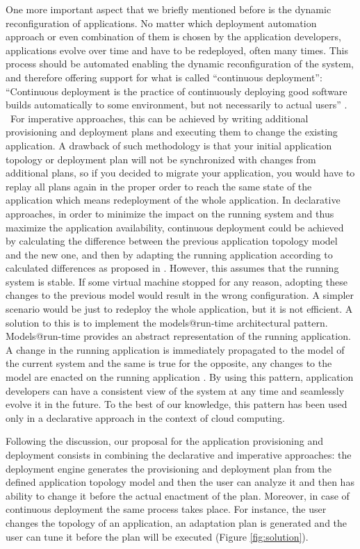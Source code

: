 \noindent One more important aspect that we briefly mentioned before is the dynamic reconfiguration of applications. No matter which deployment automation approach or even combination of them is chosen by the application developers, applications evolve over time and have to be redeployed, often many times. This process should be automated enabling the dynamic reconfiguration of the system, and therefore offering support for what is called ``continuous deployment'': ``Continuous deployment is the practice of continuously deploying good software builds automatically to some environment, but not necessarily to actual users'' \cite{fitzgerald2014continuous}. ~For imperative approaches, this can be achieved by writing additional provisioning and deployment plans and executing them to change the existing application. A drawback of such methodology is that your initial application topology or deployment plan will not be synchronized with changes from additional plans, so if you decided to migrate your application, you would have to replay all plans again in the proper order to reach the same state of the application which means redeployment of the whole application. In declarative approaches, in order to minimize the impact on the running system and thus maximize the application availability, continuous deployment could be achieved by calculating the difference between the previous application topology model and the new one, and then by adapting the running application according to calculated differences as proposed in \cite{FerrySongRCS14}. However, this assumes that the running system is stable. If some virtual machine stopped for any reason, adopting these changes to the previous model would result in the wrong configuration. A simpler scenario would be just to redeploy the whole application, but it is not efficient. A solution to this is to implement the models@run-time architectural pattern. Models@run-time provides an abstract representation of the running application. A change in the running application is immediately propagated to the model of the current system and the same is true for the opposite, any changes to the model are enacted on the running application \cite{FerrySongRCS14}. By using this pattern, application developers can have a consistent view of the system at any time and seamlessly evolve it in the future. To the best of our knowledge, this pattern has been used only in a declarative approach in the context of cloud computing.

\noindent 

\noindent Following the discussion, our proposal for the application provisioning and deployment consists in combining the declarative and imperative approaches: the deployment engine generates the provisioning and deployment plan from the defined application topology model and then the user can analyze it and then has ability to change it before the actual enactment of the plan. Moreover, in case of continuous deployment the same process takes place. For instance, the user changes the topology of an application, an adaptation plan is generated and the user can tune it before the plan will be executed (Figure \ref{fig:solution}). 

